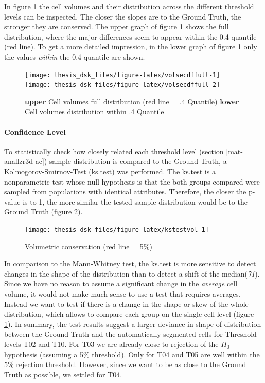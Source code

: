 \documentclass[10pt, b5paper, singlespacinge, twoside]{reedthesis} %
\theoremstyle{definition}
\theoremstyle{definition}
\theoremstyle{definition}
\theoremstyle{remark}
\begin{document}
In figure \ref{fig:volsecdffull} the cell volumes and their distribution across the different threshold levels can be inspected. The closer the slopes are to the Ground Truth, the stronger they are conserved. The upper graph of figure \ref{fig:volsecdffull} shows the full distribution, where the major differences seem to appear within the 0.4 quantile (red line). To get a more detailed impression, in the lower graph of figure \ref{fig:volsecdffull} only the values \emph{within} the 0.4 quantile are shown.


\begin{figure}

{\centering \texttt{[image: thesis\_dsk\_files/figure-latex/volsecdffull-1]} \texttt{[image: thesis\_dsk\_files/figure-latex/volsecdffull-2]} 

}

\caption[pLLP segmentation: morphological conservation]{\textbf{upper} Cell volumes full distribution (red line = .4 Quantile) \textbf{lower} Cell volumes distribution within .4 Quantile}\label{fig:volsecdffull}
\end{figure}
\hypertarget{confidence-level}{%
\paragraph{Confidence Level}\label{confidence-level}}

To statistically check how closely related each threshold level (section \ref{mat-anallzr3d-ac}) sample distribution is compared to the Ground Truth, a Kolmogorov-Smirnov-Test (ks.test) was performed. The ks.test is a nonparametric test whose null hypothesis is that the both groups compared were sampled from populations with identical attributes. Therefore, the closer the p-value is to 1, the more similar the tested sample distribution would be to the Ground Truth (figure \ref{fig:kstestvol}).


\begin{figure}[H]

{\centering \texttt{[image: thesis\_dsk\_files/figure-latex/kstestvol-1]} 

}

\caption{Volumetric conservation (red line = 5\(\%\))}\label{fig:kstestvol}
\end{figure}
\noindent In comparison to the Mann-Whitney test, the ks.test is more sensitive to detect changes in the shape of the distribution than to detect a shift of the median(\emph{71}). Since we have no reason to assume a significant change in the \emph{average} cell volume, it would not make much sense to use a test that requires averages. Instead we want to test if there is a change in the shape or skew of the whole distribution, which allows to compare each group on the single cell level (figure \ref{fig:volsecdffull}). In summary, the test results suggest a larger deviance in shape of distribution between the Ground Truth and the automatically segmented cells for Threshold levels T02 and T10. For T03 we are already close to rejection of the \(H_0\) hypothesis (assuming a 5\(\%\) threshold). Only for T04 and T05 are well within the 5\(\%\) rejection threshold. However, since we want to be as close to the Ground Truth as possible, we settled for T04.
\end{document}
